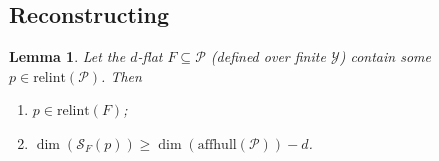 \documentclass[11pt]{article} %
\newcommand{\Comments}{1}
\newcommand{\mytodo}[2]{\ifnum\Comments=1%
	\todo[linecolor=#1!80!black,backgroundcolor=#1,bordercolor=#1!80!black]{#2}\fi}
\newcommand{\raft}[1]{\mytodo{green!20!white}{RF: #1}}
\newcommand{\jessiet}[1]{\mytodo{teal!20!white}{JF: #1}}
\newcommand{\relint}[1]{\mathrm{relint}(#1)}
\newcommand{\spn}{\mathrm{span}}
\newcommand{\affhull}{\mathrm{affhull}}
\renewcommand{\P}{\mathcal{P}}
\newcommand{\Scr}{\mathcal{S}}  %
\newcommand{\Y}{\mathcal{Y}}
\newtheorem{lemma}{Lemma}
\begin{document}
\subsection{Reconstructing \citet[Thm.\ 16]{ramaswamy2016convex}}\label{subapp:fsd-bound-reconsstruction}



\begin{lemma}\label{lem:finite-relint-dim}
  Let the $d$-flat $F\subseteq \P$ (defined over finite $\Y$) contain some $p\in\relint{\P}$.
  Then 
  \begin{enumerate}
  	\item[(i)] $p \in \relint{F}$; 
  	\item[(ii)] $\dim(\Scr_F(p)) \geq \dim(\affhull(\P)) - d$.
  \end{enumerate}
\end{lemma}
\end{document}
